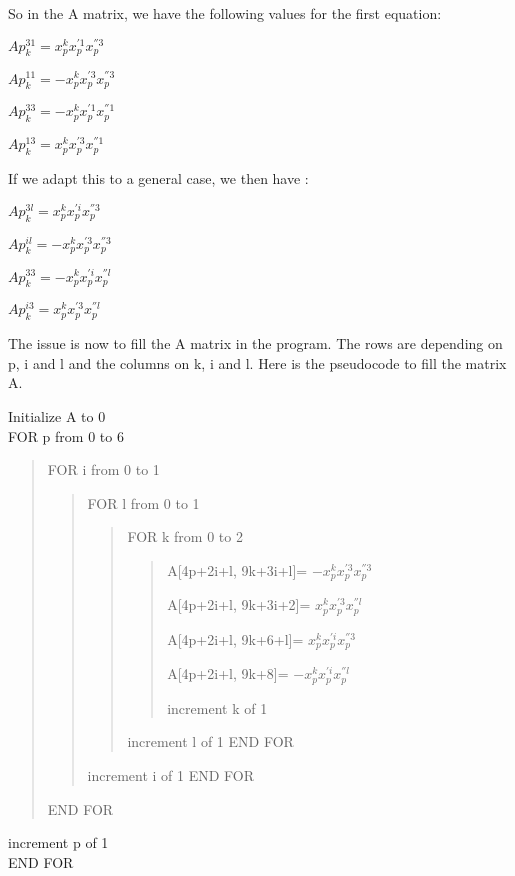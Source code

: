 \documentclass{report}
\begin{document}
So in the A matrix, we have the following values for the first equation: 
\begin{center}
$Ap_{k}^{31} = x_{p}^{k}x_{p}^{'1}x_{p}^{''3}$
\end{center}
\begin{center}
$Ap_{k}^{11} = - x_{p}^{k}x_{p}^{'3}x_{p}^{''3}$
\end{center}
\begin{center}
$Ap_{k}^{33} = -x_{p}^{k} x_{p}^{'1}x_{p}^{''1}$
\end{center}
\begin{center}
$Ap_{k}^{13} = x_{p}^{k}x_{p}^{'3}x_{p}^{''1}$
\end{center}

If we adapt this to a general case, we then have  : 
\begin{center}
$Ap_{k}^{3l} = x_{p}^{k}x_{p}^{'i}x_{p}^{''3}$
\end{center}
\begin{center}
$Ap_{k}^{il} = - x_{p}^{k}x_{p}^{'3}x_{p}^{''3}$
\end{center}
\begin{center}
$Ap_{k}^{33} = -x_{p}^{k} x_{p}^{'i}x_{p}^{''l}$
\end{center}
\begin{center}
$Ap_{k}^{i3} = x_{p}^{k}x_{p}^{'3}x_{p}^{''l}$
\end{center}


The issue is now to fill the A matrix in the program. The rows are depending on p, i and l and the columns on k, i and l. Here is the pseudocode to fill the matrix A. 

Initialize A to 0
\\FOR p from 0 to 6
	\begin{verse}
	FOR i from 0 to 1
		\begin{verse}
		FOR l from 0 to 1
			\begin{verse}
			FOR k from 0 to 2
\begin{verse}
\begin{list}{•}{•}
\item 
A[4p+2i+l, 9k+3i+l]= $-x_{p}^{k}x_{p}^{'3}x_{p}^{''3}$
\item 
A[4p+2i+l, 9k+3i+2]= $x_{p}^{k}x_{p}^{'3}x_{p}^{''l}$
\item 
A[4p+2i+l, 9k+6+l]=  $x_{p}^{k}x_{p}^{'i}x_{p}^{''3}$
\item 
A[4p+2i+l, 9k+8]=    $-x_{p}^{k}x_{p}^{'i}x_{p}^{''l}$
\end{list}

increment k of 1
\end{verse}
				increment l of 1
			END FOR
			\end{verse}
			increment i of 1		
		END FOR
		\end{verse}	
	END FOR
	\end{verse}
increment p of 1 
\\END FOR
\end{document}
